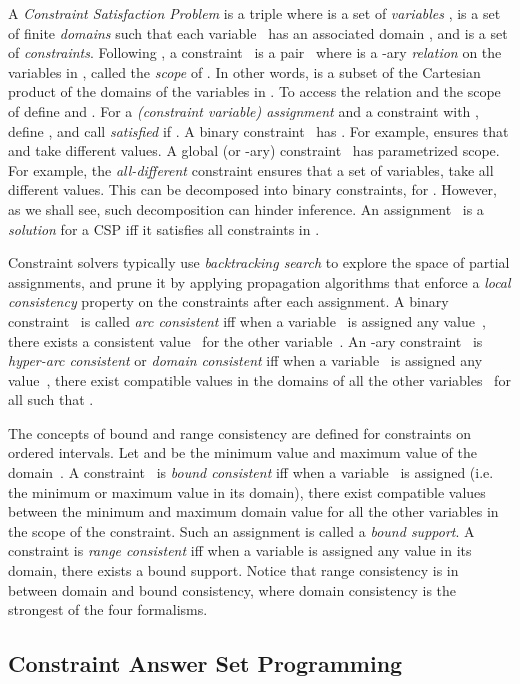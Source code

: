 \documentclass{tlp}
\begin{document}
A \emph{Constraint Satisfaction Problem} is a triple  where  is a set of \emph{variables} ,  is a set of finite \emph{domains}  such that each variable~ has an associated domain , and  is a set of \emph{constraints}. Following ,
a constraint~ is a pair~ where  is a -ary \emph{relation} on the variables in , called the \emph{scope} of . In other words,  is a subset of the Cartesian product of the domains of the variables in . To access the relation and the scope of  define  and . For a \emph{(constraint variable) assignment}  and a constraint  with , define , and call  \emph{satisfied} if . A binary constraint~ has . For example,
 ensures that  and  take different
values. A global (or -ary) constraint~ has parametrized
scope. For example, 
the \emph{all-different} constraint ensures that
a set of variables,  take all different values. 
This can be decomposed into  binary
constraints,  for . However, as 
we shall see, such decomposition can hinder inference. 
An assignment~ is a \emph{solution} for a CSP iff it satisfies all constraints in .

Constraint solvers typically use \emph{backtracking search} to explore the space of partial assignments, and prune it by applying propagation algorithms that enforce a \emph{local consistency}
property on the constraints after each assignment.
A binary constraint~ is called \emph{arc consistent} iff when a variable~ is assigned any value~, there exists a consistent value~ for the other variable~.
An -ary constraint~ is \emph{hyper-arc consistent} or \emph{domain consistent} iff when a variable~ is assigned any value~, there exist compatible values in the domains of all the other variables~ for all  such that .

The concepts of bound and range consistency are defined for constraints on ordered intervals.
Let  and  be the minimum value and maximum value of the domain~. A constraint~ is \emph{bound consistent} iff when a variable~ is assigned  (i.e. the minimum or maximum value in its domain), there exist compatible values between the minimum and maximum domain value for all the other variables in the scope of the constraint. Such an assignment is called a \emph{bound support}. A constraint is \emph{range consistent} iff when a variable is assigned any value in its domain, there exists a bound support. Notice that range consistency is in between domain and bound consistency, where domain consistency is the strongest of the four formalisms.


\subsection{Constraint Answer Set Programming}
\end{document}
